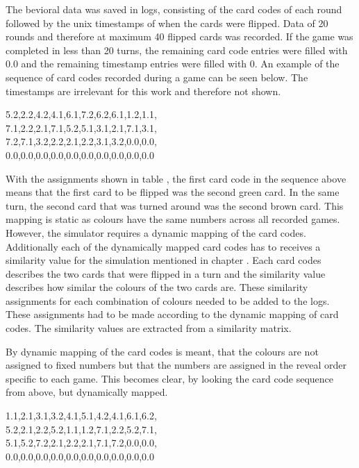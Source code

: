 The bevioral data was saved in logs, consisting of the card codes of each round followed by the unix timestamps of when the cards were flipped. Data of 20 rounds and therefore at maximum 40 flipped cards was recorded. If the game was completed in less than 20 turns, the remaining card code entries were filled with 0.0 and the remaining timestamp entries were filled with 0. An example of the sequence of card codes recorded during a game can be seen below. The timestamps are irrelevant for this work and therefore not shown. 
\begin{center}
	5.2,2.2,4.2,4.1,6.1,7.2,6.2,6.1,1.2,1.1,\\
	7.1,2.2,2.1,7.1,5.2,5.1,3.1,2.1,7.1,3.1,\\
	7.2,7.1,3.2,2.2,2.1,2.2,3.1,3.2,0.0,0.0,\\
	0.0,0.0,0.0,0.0,0.0,0.0,0.0,0.0,0.0,0.0
\end{center}

With the assignments shown in table , the first card code in the sequence above means that the first card to be flipped was the second green card. In the same turn, the second card that was turned around was the second brown card. This mapping is static as colours have the same numbers across all recorded games. However, the simulator requires a dynamic mapping of the card codes. Additionally each of the dynamically mapped card codes has to receives a similarity value for the simulation mentioned in chapter . Each card codes describes the two cards that were flipped in a turn and the similarity value describes how similar the colours of the two cards are. These similarity assignments for each combination of colours needed to be added to the logs. These assignments had to be made according to the dynamic mapping of card codes. The similarity values are extracted from a similarity matrix. 

By dynamic mapping of the card codes is meant, that the colours are not assigned to fixed numbers but that the numbers are assigned in the reveal order specific to each game. This becomes clear, by looking the card code sequence from above, but dynamically mapped.
\begin{center}
	1.1,2.1,3.1,3.2,4.1,5.1,4.2,4.1,6.1,6.2,\\
	5.2,2.1,2.2,5.2,1.1,1.2,7.1,2.2,5.2,7.1,\\
	5.1,5.2,7.2,2.1,2.2,2.1,7.1,7.2,0.0,0.0,\\
	0.0,0.0,0.0,0.0,0.0,0.0,0.0,0.0,0.0,0.0
\end{center}

